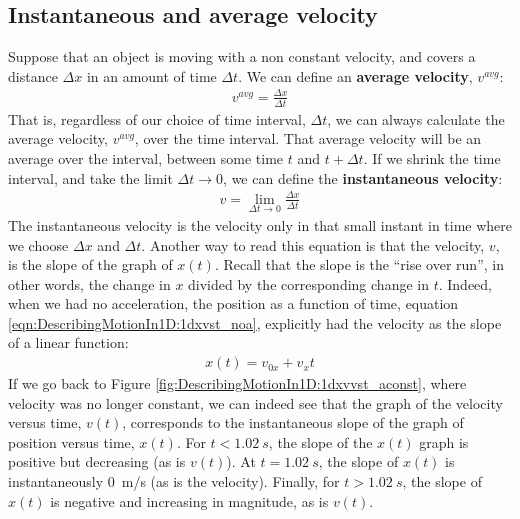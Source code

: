 \subsection{Instantaneous and average velocity}

Suppose that an object is moving with a non constant velocity, and covers a distance $\Delta x$ in an amount of time $\Delta t$. We can define an \textbf{average velocity}, $v^{avg}$:
\begin{align*}
v^{avg}= \frac{\Delta x}{\Delta t}
\end{align*}
That is, regardless of our choice of time interval, $\Delta t$, we can always calculate the average velocity, $v^{avg}$, over the time interval. That average velocity will be an average over the interval, between some time $t$ and $t+\Delta t$. If we shrink the time interval, and take the limit $\Delta t\to 0$, we can define the \textbf{instantaneous velocity}:
\begin{align*}
v = \lim_{\Delta t\to 0} \frac{\Delta x}{\Delta t}
\end{align*}
The instantaneous velocity is the velocity only in that small instant in time where we choose $\Delta x$ and $\Delta t$. Another way to read this equation is that the velocity, $v$, is the slope of the graph of $x(t)$. Recall that the slope is the ``rise over run'', in other words, the change in $x$ divided by the corresponding change in $t$. Indeed, when we had no acceleration, the position as a function of time, equation \ref{eqn:DescribingMotionIn1D:1dxvst_noa}, explicitly had the velocity as the slope of a linear function:
 \begin{align*}
 x(t) = v_{0x}+v_xt
 \end{align*}
 If we go back to Figure \ref{fig:DescribingMotionIn1D:1dxvvst_aconst}, where velocity was no longer constant, we can indeed see that the graph of the velocity versus time, $v(t)$, corresponds to the instantaneous slope of the graph of position versus time, $x(t)$. For $t<\SI{1.02}{s}$, the slope of the $x(t)$ graph is positive but decreasing (as is $v(t)$). At $t=\SI{1.02}{s}$, the slope of $x(t)$ is instantaneously \SI{0}{m/s} (as is the velocity). Finally, for $t>\SI{1.02}{s}$, the slope of $x(t)$ is negative and increasing in magnitude, as is $v(t)$.

